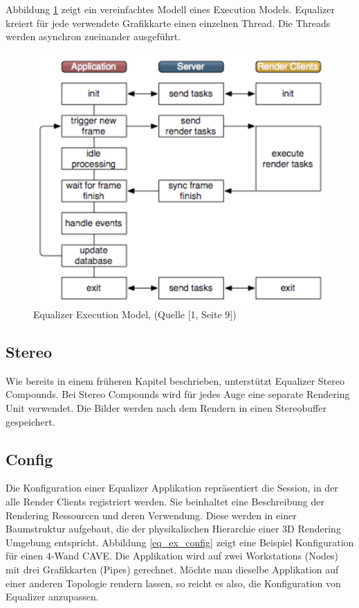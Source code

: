 Abbildung \ref{eq_exec} zeigt ein vereinfachtes Modell eines Execution Models. Equalizer kreiert f\"ur jede verwendete Grafikkarte einen einzelnen Thread. Die Threads werden asynchron zueinander ausgef\"uhrt.

\begin{figure}[ht]
\centering
\includegraphics[scale=0.5]{../figures/equalizer_execution_flow}
\caption{Equalizer Execution Model, (Quelle [1, Seite 9])}
\label{eq_exec}
\end{figure}

\subsection{Stereo}
Wie bereits in einem fr\"uheren Kapitel beschrieben, unterst\"utzt Equalizer Stereo Compounds. Bei Stereo Compounds wird f\"ur jedes Auge eine separate Rendering Unit verwendet. Die Bilder werden nach dem Rendern in einen Stereobuffer gespeichert. 


\subsection{Config}
Die Konfiguration einer Equalizer Applikation repr\"asentiert die Session, in der alle Render Clients registriert werden. Sie beinhaltet eine Beschreibung der Rendering Ressourcen und deren Verwendung. Diese werden in einer Baumstruktur aufgebaut, die der physikalischen Hierarchie einer 3D Rendering Umgebung entspricht. 
Abbildung \ref{eq_ex_config} zeigt eine Beispiel Konfiguration f\"ur einen 4-Wand CAVE. Die Applikation wird auf zwei Workstations (Nodes) mit drei Grafikkarten (Pipes) gerechnet. M\"ochte man dieselbe Applikation auf einer anderen Topologie rendern lassen, so reicht es also, die Konfiguration von Equalizer anzupassen.

